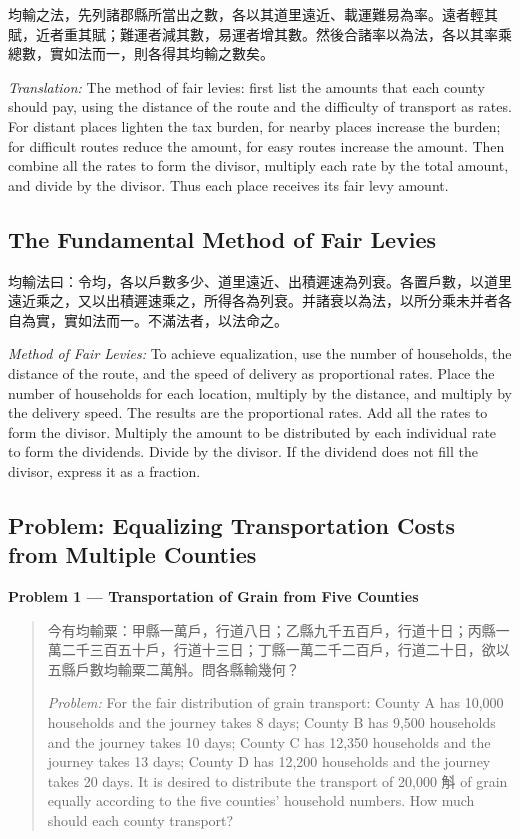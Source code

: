 \documentclass[11pt,a4paper]{article}
\newcommand{\zh}[1]{{#1}}
\newenvironment{chproblem}[1][]{%
  \par\medskip\noindent\textbf{\textcolor{sectioncolor}{#1}}\par\nopagebreak
  \begin{quote}\small
}{%
  \end{quote}\medskip
}
\newenvironment{chpassage}{%
  \par\medskip
  \begin{center}
  \begin{minipage}{0.95\textwidth}
  \setlength{\parindent}{2em}
  \linespread{1.3}\selectfont
}{%
  \end{minipage}
  \end{center}
  \medskip
}
\begin{document}
\begin{chpassage}
\zh{均輸之法，先列諸郡縣所當出之數，各以其道里遠近、載運難易為率。遠者輕其賦，近者重其賦；難運者減其數，易運者增其數。然後合諸率以為法，各以其率乘總數，實如法而一，則各得其均輸之數矣。}

\medskip
\textit{Translation:} The method of fair levies: first list the amounts that
each county should pay, using the distance of the route and the difficulty of
transport as rates. For distant places lighten the tax burden, for nearby
places increase the burden; for difficult routes reduce the amount, for easy
routes increase the amount. Then combine all the rates to form the divisor,
multiply each rate by the total amount, and divide by the divisor. Thus each
place receives its fair levy amount.
\end{chpassage}

\subsection{The Fundamental Method of Fair Levies}

\begin{chpassage}
\zh{均輸法曰：令均，各以戶數多少、道里遠近、出積遲速為列衰。各置戶數，以道里遠近乘之，又以出積遲速乘之，所得各為列衰。并諸衰以為法，以所分乘未并者各自為實，實如法而一。不滿法者，以法命之。}

\medskip
\textit{Method of Fair Levies:} To achieve equalization, use the number of
households, the distance of the route, and the speed of delivery as
proportional rates. Place the number of households for each location,
multiply by the distance, and multiply by the delivery speed. The results are
the proportional rates. Add all the rates to form the divisor. Multiply the
amount to be distributed by each individual rate to form the dividends. Divide
by the divisor. If the dividend does not fill the divisor, express it as a
fraction.
\end{chpassage}

\subsection{Problem: Equalizing Transportation Costs from Multiple Counties}

\begin{chproblem}[Problem 1 --- Transportation of Grain from Five Counties]
\zh{今有均輸粟：甲縣一萬戶，行道八日；乙縣九千五百戶，行道十日；丙縣一萬二千三百五十戶，行道十三日；丁縣一萬二千二百戶，行道二十日，欲以五縣戶數均輸粟二萬斛。問各縣輸幾何？}

\medskip
\textit{Problem:} For the fair distribution of grain transport: County A has
10,000 households and the journey takes 8 days; County B has 9,500 households
and the journey takes 10 days; County C has 12,350 households and the journey
takes 13 days; County D has 12,200 households and the journey takes 20 days.
It is desired to distribute the transport of 20,000 \zh{斛} of grain equally
according to the five counties' household numbers. How much should each county
transport?
\end{chproblem}
\end{document}
